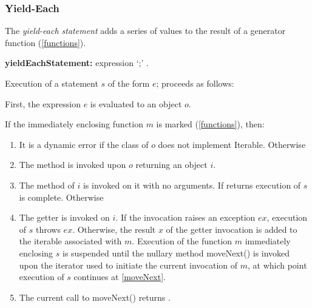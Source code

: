 \documentclass{article}
\newcommand{\code}[1]{{\sf #1}}
\begin{document}
 
 \subsubsection{ Yield-Each}
 
\LMHash{}
 The {\em yield-each statement} adds a series of values to the result of a generator function (\ref{functions}).
 
 \begin{grammar}
{\bf yieldEachStatement:}
   \YIELD* expression `{\escapegrammar ;}'
      .
\end{grammar}

\LMHash{}
Execution of a statement $s$ of the form \code{\YIELD* $e$;}  proceeds as follows:

\LMHash{}
First, the expression $e$ is evaluated to an object $o$. 

\LMHash{}
If the immediately enclosing function $m$ is marked \SYNC* (\ref{functions}), then:
\begin{enumerate}
\item It is a dynamic error if the class of $o$ does not implement \code{Iterable}.  Otherwise
\item The method  is invoked upon $o$ returning an object $i$. 
\item \label{moveNext} The  method of $i$ is invoked on it with no arguments. If  returns \FALSE{} execution of $s$ is complete. Otherwise
\item The getter  is invoked on $i$. If the invocation raises an exception $ex$, execution of $s$ throws $ex$. Otherwise, the result $x$ of the getter invocation is added to the iterable associated with $m$.
Execution of the function $m$ immediately enclosing $s$ is suspended until the nullary method \code{moveNext()} is invoked upon the iterator used to initiate the current invocation of $m$, at which point execution of $s$ continues at \ref{moveNext}. 
\item
The current call to \code{moveNext()} returns \TRUE.
\end{enumerate}
\end{document}
